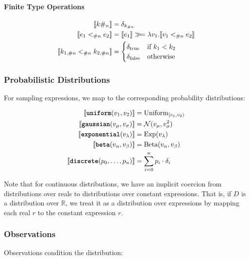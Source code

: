 \paragraph{Finite Type Operations}
\begin{align*}
\llbracket k\#_{n} \rrbracket &= \delta_{k_{\#n}} \\
\llbracket e_1 <_{\#{n}} e_2 \rrbracket &= \llbracket e_1 \rrbracket \gg\!= \lambda v_1. \llbracket v_1 <_{\#{n}} e_2 \rrbracket \\
\llbracket k_{1,\#n} <_{\#{n}} k_{2,\#n} \rrbracket &= \begin{cases}
    \delta_{\text{true}} & \text{if } k_1 < k_2 \\
    \delta_{\text{false}} & \text{otherwise}
\end{cases}
\end{align*}

\subsubsection{Probabilistic Distributions}

For sampling expressions, we map to the corresponding probability distributions:

\begin{align*}
\llbracket \text{\ttfamily\bfseries uniform}(v_1, v_2) \rrbracket &= \text{Uniform}_{[v_1, v_2)} \\
\llbracket \text{\ttfamily\bfseries gaussian}(v_\mu, v_\sigma) \rrbracket &= \mathcal{N}(v_\mu, v_\sigma^2) \\
\llbracket \text{\ttfamily\bfseries exponential}(v_\lambda) \rrbracket &= \text{Exp}(v_\lambda) \\
\llbracket \text{\ttfamily\bfseries beta}(v_\alpha, v_\beta) \rrbracket &= \text{Beta}(v_\alpha, v_\beta) \\
\llbracket \text{\ttfamily\bfseries discrete}(p_0, \ldots, p_n) \rrbracket &= \sum_{i=0}^n p_i \cdot \delta_i
\end{align*}

Note that for continuous distributions, we have an implicit coercion from distributions over reals to distributions over constant expressions. That is, if $D$ is a distribution over $\mathbb{R}$, we treat it as a distribution over expressions by mapping each real $r$ to the constant expression $r$.

\subsubsection{Observations}

Observations condition the distribution:

